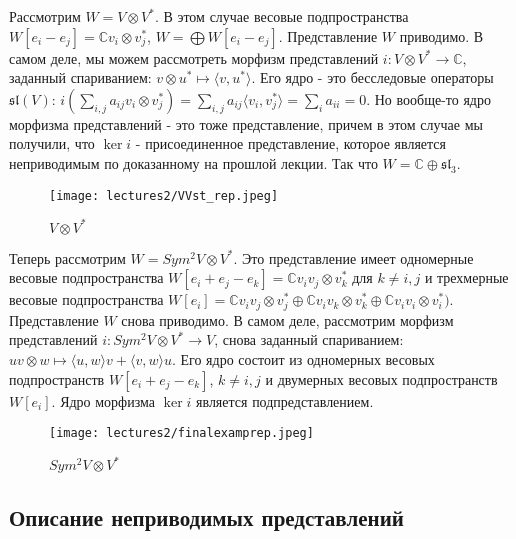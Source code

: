 \documentclass[a4article]{article}
\begin{document}
Рассмотрим $W = V \otimes V^*$. В этом случае весовые подпространства $W[e_i - e_j] = \mathbb{C}v_i \otimes v_j^*$, $W = \bigoplus W[e_i-e_j]$. Представление $W$ приводимо. В самом деле, мы можем рассмотреть морфизм представлений $i: V \otimes V^* \rightarrow \mathbb{C}$, заданный спариванием: $v \otimes u^* \mapsto \langle v, u^*\rangle$. Его ядро - это бесследовые операторы $\mathfrak{sl}(V)$: $i(\sum_{i,j} a_{ij}v_i\otimes v^*_j) = \sum_{i,j}a_{ij}\langle v_i, v_j^* \rangle = \sum_{i}a_{ii} = 0$. Но вообще-то ядро морфизма представлений - это тоже представление, причем в этом случае мы получили, что $\ker {i}$ - присоединенное представление, которое является неприводимым по доказанному на прошлой лекции. Так что $W = \mathbb{C} \oplus \mathfrak{sl}_3$.

\begin{figure}[h!]
\centering
\texttt{[image: lectures2/VVst\_rep.jpeg]}
\caption{$V\otimes V^*$}
\label{fig:enter-label}
\end{figure}

Теперь рассмотрим $W = Sym^2 V \otimes V^*$. Это представление имеет одномерные весовые подпространства $W[e_i + e_j - e_k] = \mathbb{C}v_iv_j \otimes v_k^*$ для $k \ne i, j$  и трехмерные весовые подпространства 
$W[e_i] = \mathbb{C}v_iv_j\otimes v_j^* \oplus \mathbb{C}v_iv_k\otimes v_k^*\oplus \mathbb{C}v_iv_i\otimes v_i^*)$. Представление $W$ снова приводимо. В самом деле, рассмотрим морфизм представлений $i: Sym^2 V \otimes V^* \rightarrow V$, снова заданный спариванием: $uv \otimes w \mapsto \langle u, w \rangle v+\langle v, w \rangle u$. Его ядро состоит из одномерных весовых подпространств $W[e_i+e_j-e_k]$, $k \ne i, j$ и двумерных весовых подпространств $W[e_i]$. Ядро морфизма $\ker{i}$ является подпредставлением. 
\begin{figure}[h!]
\centering
\texttt{[image: lectures2/finalexamprep.jpeg]}
\caption{$Sym^2V\otimes V^*$}
\label{fig:enter-label}
\end{figure}

\newpage
\subsection*{Описание неприводимых представлений}
\end{document}
